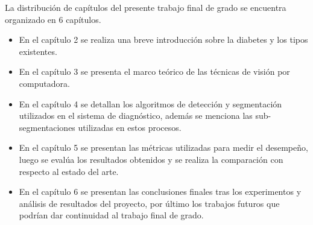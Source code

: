 La distribución de capítulos del presente trabajo final de grado se encuentra organizado en 6 capítulos.
\begin{itemize}

\item En el capítulo 2  se realiza una breve introducción sobre la diabetes y los tipos existentes.
\item En el capítulo 3  se presenta el marco teórico de las técnicas de  visión por computadora. %
\item En el capítulo 4  se detallan  los algoritmos de detección y segmentación utilizados en el sistema de diagnóstico, además  se menciona las sub-segmentaciones utilizadas en estos procesos.
\item En el capítulo 5  se presentan las métricas  utilizadas para medir el desempeño, luego se evalúa los resultados obtenidos y se realiza  la comparación con respecto al estado del arte.

\item En el capítulo 6 se presentan las conclusiones finales tras los experimentos y análisis de resultados del proyecto, por último los trabajos futuros que podrían dar continuidad al trabajo final de grado. 
\end{itemize}
